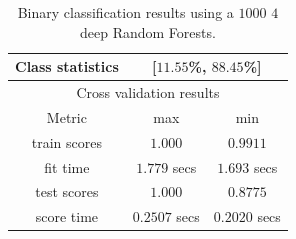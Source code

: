 \documentclass[../main.tex]{subfile}
\begin{document}
    \begin{table}[H]
        \caption{\label{tab::binary_rf_1000_4}Binary classification results using a $1000$ $4$ deep Random Forests.}
        \begin{tabular}{|c|c|c|}
            \hline
            Class statistics & \multicolumn{2}{|c|}{[$11.55$\%, $88.45$\%]} \\
            \hline
            \multicolumn{3}{|c|}{Cross validation results}\\
            \hline
            Metric & max & min \\
             \hline
            train scores & $1.000$ & $0.9911$ \\
             \hline
            fit time & $1.779$ secs & $1.693$ secs \\
             \hline
            test scores & $1.000$ & $0.8775$\\
             \hline
            score time & $0.2507$ secs & $0.2020$ secs\\
             \hline
        \end{tabular}
    \end{table}
\end{document}
